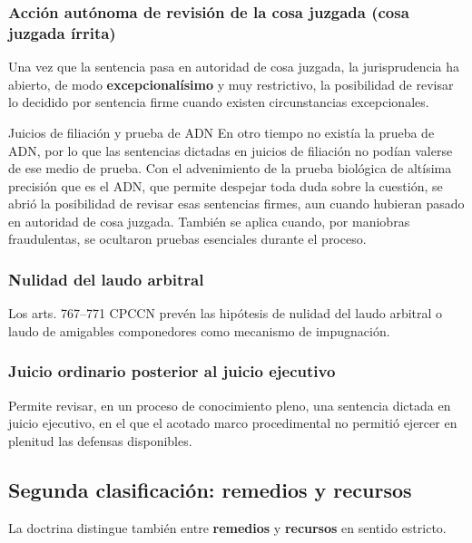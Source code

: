 \documentclass[12pt,oneside]{book}
\begin{document}
\subsubsection{Acción autónoma de revisión de la cosa juzgada (cosa juzgada írrita)}

Una vez que la sentencia pasa en autoridad de cosa juzgada, la jurisprudencia ha abierto, de modo \textbf{excepcionalísimo} y muy restrictivo, la posibilidad de revisar lo decidido por sentencia firme cuando existen circunstancias excepcionales.

\begin{example}{Juicios de filiación y prueba de ADN}
En otro tiempo no existía la prueba de ADN, por lo que las sentencias dictadas en juicios de filiación no podían valerse de ese medio de prueba. Con el advenimiento de la prueba biológica de altísima precisión que es el ADN, que permite despejar toda duda sobre la cuestión, se abrió la posibilidad de revisar esas sentencias firmes, aun cuando hubieran pasado en autoridad de cosa juzgada. También se aplica cuando, por maniobras fraudulentas, se ocultaron pruebas esenciales durante el proceso.
\end{example}

\subsubsection{Nulidad del laudo arbitral}

Los arts. 767--771 CPCCN prevén las hipótesis de nulidad del laudo arbitral o laudo de amigables componedores como mecanismo de impugnación.

\subsubsection{Juicio ordinario posterior al juicio ejecutivo}

Permite revisar, en un proceso de conocimiento pleno, una sentencia dictada en juicio ejecutivo, en el que el acotado marco procedimental no permitió ejercer en plenitud las defensas disponibles.

\subsection{Segunda clasificación: remedios y recursos}

La doctrina distingue también entre \textbf{remedios} y \textbf{recursos} en sentido estricto.
\end{document}
